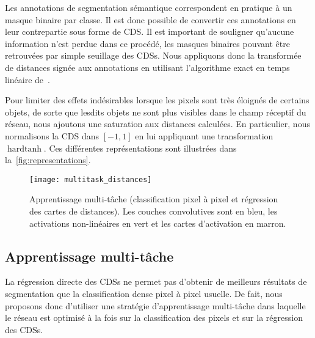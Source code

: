 Les annotations de segmentation sémantique correspondent en pratique à un masque binaire par classe. Il est donc possible de convertir ces annotations en leur contrepartie sous forme de \gls{CDS}. Il est important de souligner qu'aucune information n'est perdue dans ce procédé, les masques binaires pouvant être retrouvées par simple seuillage des \glspl{CDS}. Nous appliquons donc la transformée de distances signée aux annotations en utilisant l'algorithme exact en temps linéaire de~\citet{maurer_linear_2003}.

Pour limiter des effets indésirables lorsque les pixels sont très éloignés de certains objets, de sorte que lesdits objets ne sont plus visibles dans le champ réceptif du réseau, nous ajoutons une saturation aux distances calculées. En particulier, nous normalisons la \gls{CDS} dans $[-1, 1]$ en lui appliquant une transformation $\operatorname{hardtanh}$. Ces différentes représentations sont illustrées dans la~\cref{fig:representations}.

\begin{figure*}[!t]
	\centering
	\texttt{[image: multitask\_distances]}
    \caption{Apprentissage multi-tâche (classification pixel à pixel et régression des cartes de distances). Les couches convolutives sont en {\color{blue}bleu}, les activations non-linéaires en {\color{green!50!black}vert} et les cartes d'activation en {\color{brown}marron}.}
    \label{fig:distance_framework}
\end{figure*}

\subsection{Apprentissage multi-tâche}


La régression directe des \glspl{CDS} ne permet pas d'obtenir de meilleurs résultats de segmentation que la classification dense pixel à pixel usuelle. De fait, nous proposons donc d'utiliser une stratégie d'apprentissage multi-tâche dans laquelle le réseau est optimisé à la fois sur la classification des pixels et sur la régression des \glspl{CDS}.

